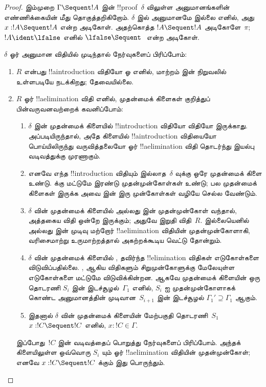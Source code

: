 \documentclass[../../../include/open-logic-section]{subfiles}
\begin{document}
\begin{proof}
இம்முறை $\Gamma \Sequent !A$ இன்
!!{proof}~$\delta$ விலுள்ள அனுமானங்களின்
எண்ணிக்கையின் மீது தொகுத்தறிகிறோம்.
$\delta$ இல் அனுமானமே இல்லை எனில்,
அது $x:!A \Sequent !A$ என்ற அடிகோள்.
அதற்கொத்த $!A \Sequent !A$ அடிகோளே~$\pi$;
$!A \ident \lfalse$ எனில்
$\lfalse \Sequent \ $ என்ற அடிகோள்.

$\delta$ ஓர் அனுமான விதியில்
முடிந்தால் நேர்வுகளைப் பிரிப்போம்:
\begin{enumerate}
  \item $R$ என்பது !!a{introduction} விதியோ
  \FalseInt ஓ எனில், மாற்றம்
   இன்
  நிறுவலில் உள்ளபடியே நடக்கிறது;
  \Cut{} தேவையில்லை.

  \item $R$ ஓர் !!a{elimination} விதி
  எனில், முதன்மைக் கிளைகள் குறித்துப்
  பின்வருவனவற்றைக் கவனிப்போம்:
  \begin{enumerate}
    \item $\delta$ இன் முதன்மைக் கிளையில்
    !!{introduction} விதியோ \FalseInt{}
    விதியோ இருக்காது. அப்படியிருந்தால்,
    அதே கிளையில் !!a{introduction} விதியையோ
    பொய்யிலிருந்து வருவித்தலையோ ஓர்
    !!a{elimination} விதி தொடர்ந்து
    இயல்பு வடிவத்துக்கு முரணாகும்.
    \item எனவே எந்த !!{introduction} விதியும்
    இல்லாத~$\delta$ வுக்கு ஒரே
    முதன்மைக் கிளை உண்டு. \Intro{\land}
    க்கு மட்டுமே இரண்டு முதன்முன்கோள்கள்
    உண்டு; பல முதன்மைக் கிளைகள் இருக்க
    அவை \Intro{\land} இன் இரு
    முன்கோள்கள் வழியே செல்ல வேண்டும்.
    \item $\delta$ வின் முதன்மைக் கிளையில் \Elim{\lor}
    அல்லது \Elim{\lexists} இன்
    முதன்முன்கோள் வந்தால், அத்தகைய விதி
    ஒன்றே இருக்கும்; அதுவே இறுதி விதி~$R$.
    இல்லையெனில் \Elim{\lor} அல்லது
    \Elim{\lexists} இன் முடிவு மற்றோர்
    !!a{elimination} விதியின்
    முதன்முன்கோளாகி, வரிசைமாற்று
    உருமாற்றத்தால் அகற்றக்கூடிய வெட்டு
    தோன்றும்.
    \item $\delta$ வின் முதன்மைக் கிளையில்
    \Elim{\lor},
    \Elim{\lexists} தவிர்ந்த
    !!{elimination} விதிகள் எடுகோள்களை
    விடுவிப்பதில்லை. \Elim{\lor},
    \Elim{\lexists} ஆகிய விதிகளும்
    சிறுமுன்கோளுக்கு மேலேயுள்ள
    எடுகோள்களை மட்டுமே விடுவிக்கின்றன.
    ஆகவே முதன்மைக் கிளையின் ஒரு தொடரணி
    $S_i$ இன் இடச்சூழல்~$\Gamma_1$
    எனில், $S_i$ ஐ முதன்முன்கோளாகக் கொண்ட
    அனுமானத்தின் முடிவான~$S_{i+1}$
    இன் இடச்சூழல் $\Gamma_1'
    \supseteq \Gamma_1$ ஆகும்.
    \item இதனால் $\delta$ வின் முதன்மைக் கிளையின்
    மேற்பகுதி தொடரணி~$S_1$
    $x: !C \Sequent !C$ எனில்,
    $x:!C \in \Gamma$.
  \end{enumerate}
  இப்போது~$!C$ இன் வடிவத்தைப் பொறுத்து
  நேர்வுகளைப் பிரிப்போம். அந்தக்
  கிளையிலுள்ள ஒவ்வொரு $S_i$ யும் ஓர்
  !!a{elimination} விதியின்
  முதன்முன்கோள்; எனவே
  $x:!C \Sequent !C$ க்கும் இது பொருந்தும்.


\end{enumerate}
\end{proof}
\end{document}

